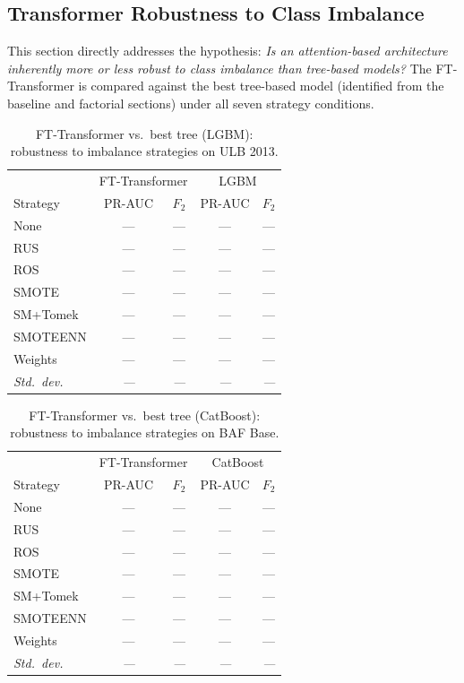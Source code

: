 \subsection{Transformer Robustness to Class Imbalance}
\label{sec:transformer_imbalance}

This section directly addresses the hypothesis:
\emph{Is an attention-based architecture inherently more or less robust to
class imbalance than tree-based models?}
The FT-Transformer is compared against the best tree-based model
(identified from the baseline and factorial sections) under all seven
strategy conditions.

\begin{table}[ht]
\centering
\caption{FT-Transformer vs.\ best tree (LGBM): robustness to imbalance strategies on ULB 2013.}
\label{tab:transformer_robustness_ulb}
\begin{tabular}{l cc cc}
\toprule
& \multicolumn{2}{c}{FT-Transformer} & \multicolumn{2}{c}{LGBM} \\
Strategy & PR-AUC & $F_2$ & PR-AUC & $F_2$ \\
\midrule
None      & --- & --- & --- & --- \\
RUS       & --- & --- & --- & --- \\
ROS       & --- & --- & --- & --- \\
SMOTE     & --- & --- & --- & --- \\
SM+Tomek  & --- & --- & --- & --- \\
SMOTEENN  & --- & --- & --- & --- \\
Weights   & --- & --- & --- & --- \\
\midrule
\textit{Std.\ dev.} & \textit{---} & \textit{---} & \textit{---} & \textit{---} \\
\bottomrule
\end{tabular}
\end{table}

\begin{table}[ht]
\centering
\caption{FT-Transformer vs.\ best tree (CatBoost): robustness to imbalance strategies on BAF Base.}
\label{tab:transformer_robustness_baf}
\begin{tabular}{l cc cc}
\toprule
& \multicolumn{2}{c}{FT-Transformer} & \multicolumn{2}{c}{CatBoost} \\
Strategy & PR-AUC & $F_2$ & PR-AUC & $F_2$ \\
\midrule
None      & --- & --- & --- & --- \\
RUS       & --- & --- & --- & --- \\
ROS       & --- & --- & --- & --- \\
SMOTE     & --- & --- & --- & --- \\
SM+Tomek  & --- & --- & --- & --- \\
SMOTEENN  & --- & --- & --- & --- \\
Weights   & --- & --- & --- & --- \\
\midrule
\textit{Std.\ dev.} & \textit{---} & \textit{---} & \textit{---} & \textit{---} \\
\bottomrule
\end{tabular}
\end{table}

